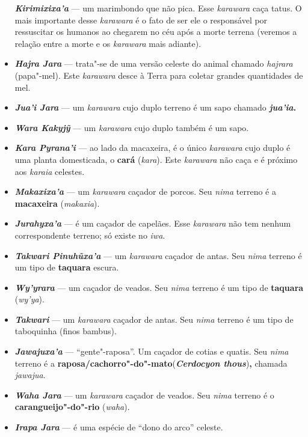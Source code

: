 \begin{itemize}
  \emph{\textbf{Kirimixixa'a}} --- um marimbondo que não pica. Esse
  \emph{karawara} caça tatus. O mais importante desse \emph{karawara} é
  o fato de ser ele o responsável por ressuscitar os humanos ao chegarem
  no céu após a morte terrena (veremos a relação entre a morte e os
  \emph{karawara} mais adiante).
\item
  \emph{\textbf{Hajra Jara}} --- trata"-se de uma versão celeste do animal
  chamado \emph{hajrara} (papa"-mel). Este \emph{karawara} desce à Terra
  para coletar grandes quantidades de mel.
\item
  \emph{\textbf{Jua'i Jara}} --- um \emph{karawara} cujo duplo terreno é
  um sapo chamado \textbf{\emph{jua'ia}.}
\item
  \emph{\textbf{Wara Kakyjỹ}} --- um \emph{karawara} cujo duplo também é
  um sapo.
\item
  \emph{\textbf{Kara Pyrana'i}} --- ao lado da macaxeira, é o único
  \emph{karawara} cujo duplo é uma planta domesticada, o \textbf{cará}
  (\emph{kara}). Este \emph{karawara} não caça e é próximo aos
  \emph{karaia} celestes.
\item
  \emph{\textbf{Makaxixa'a}} --- um \emph{karawara} caçador de porcos. Seu
  \emph{nima} terreno é a \textbf{macaxeira} (\emph{makaxia}).
\item
  \emph{\textbf{Jurahyxa'a}} --- é um caçador de capelães. Esse
  \emph{karawara} não tem nenhum correspondente terreno; só existe no
  \emph{iwa}.
\item
  \emph{\textbf{Takwari Pinuhũxa'a}} --- um \emph{karawara} caçador de
  antas. Seu \emph{nima} terreno é um tipo de \textbf{taquara} escura.
\item
  \emph{\textbf{Wy'yrara}} --- um caçador de veados. Seu \emph{nima}
  terreno é um tipo de \textbf{taquara} (\emph{wy'ya}).
\item
  \emph{\textbf{Takwari}} --- um \emph{karawara} caçador de antas. Seu
  \emph{nima} terreno é um tipo de taboquinha (finos bambus).
\item
  \emph{\textbf{Jawajuxa'a}} --- ``gente"-raposa''. Um caçador de cotias e
  quatis. Seu \emph{nima} terreno é a
  \textbf{raposa/cachorro"-do"-mato}(\emph{\textbf{Cerdocyon
  thous}})\textbf{,} chamada \emph{jawajua}.
\item
  \emph{\textbf{Waha Jara}} --- um \emph{karawara} caçador de veados. Seu
  \emph{nima} terreno é o \textbf{carangueijo"-do"-rio} (\emph{waha}).
\item
  \emph{\textbf{Irapa Jara}} --- é uma espécie de ``dono do arco'' celeste.

\end{itemize}
